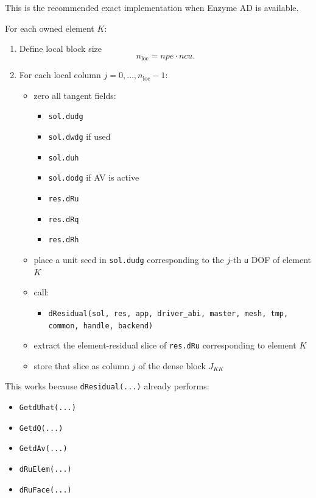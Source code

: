 \documentclass[11pt]{article}
\begin{document}
This is the recommended exact implementation when Enzyme AD is available.

For each owned element $K$:

\begin{enumerate}[leftmargin=*]
\item Define local block size
\[
n_{\mathrm{loc}} = npe \cdot ncu.
\]

\item For each local column $j = 0, \dots, n_{\mathrm{loc}}-1$:
\begin{itemize}[leftmargin=*]
\item zero all tangent fields:
\begin{itemize}[leftmargin=*]
\item \texttt{sol.dudg}
\item \texttt{sol.dwdg} if used
\item \texttt{sol.duh}
\item \texttt{sol.dodg} if AV is active
\item \texttt{res.dRu}
\item \texttt{res.dRq}
\item \texttt{res.dRh}
\end{itemize}
\item place a unit seed in \texttt{sol.dudg} corresponding to the $j$-th
\texttt{u} DOF of element $K$
\item call:
\begin{itemize}[leftmargin=*]
\item \texttt{dResidual(sol, res, app, driver\_abi, master, mesh, tmp, common, handle, backend)}
\end{itemize}
\item extract the element-residual slice of \texttt{res.dRu} corresponding to
element $K$
\item store that slice as column $j$ of the dense block $J_{KK}$
\end{itemize}
\end{enumerate}

This works because \texttt{dResidual(...)} already performs:

\begin{itemize}[leftmargin=*]
\item \texttt{GetdUhat(...)}
\item \texttt{GetdQ(...)}
\item \texttt{GetdAv(...)}
\item \texttt{dRuElem(...)}
\item \texttt{dRuFace(...)}
\end{itemize}
\end{document}
